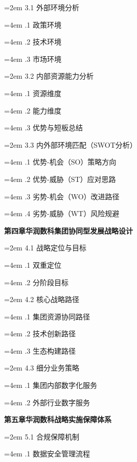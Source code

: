 \documentclass[UTF8, a4paper, 11pt]{ctexart}
\begin{document}
\begin{UnifiedBox}
\hangindent=2em 
3.1 外部环境分析

\hangindent=4em 
.1 政策环境

\hangindent=4em 
.2 技术环境

\hangindent=4em 
.3 市场环境

\hangindent=2em 
3.2 内部资源能力分析

\hangindent=4em 
.1 资源维度

\hangindent=4em 
.2 能力维度

\hangindent=4em 
.3 优势与短板总结

\hangindent=2em 
3.3 内外部环境匹配（SWOT分析）

\hangindent=4em 
.1 优势-机会（SO）策略方向

\hangindent=4em 
.2 优势-威胁（ST）应对思路

\hangindent=4em 
.3 劣势-机会（WO）改进路径

\hangindent=4em 
.4 劣势-威胁（WT）风险规避

\vspace{0.3cm}
\noindent \textbf{第四章\quad 华润数科集团协同型发展战略设计}

\hangindent=2em 
4.1 战略定位与目标

\hangindent=4em 
.1 双重定位

\hangindent=4em 
.2 分阶段目标

\hangindent=2em 
4.2 核心战略路径

\hangindent=4em 
.1 集团资源协同路径

\hangindent=4em 
.2 技术创新路径

\hangindent=4em 
.3 生态构建路径

\hangindent=2em 
4.3 细分业务策略

\hangindent=4em 
.1 集团内部数字化服务

\hangindent=4em 
.2 外部行业数字服务

\vspace{0.3cm}
\noindent \textbf{第五章\quad 华润数科战略实施保障体系}

\hangindent=2em 
5.1 合规保障机制

\hangindent=4em 
.1 数据安全管理流程


\end{UnifiedBox}
\end{document}
